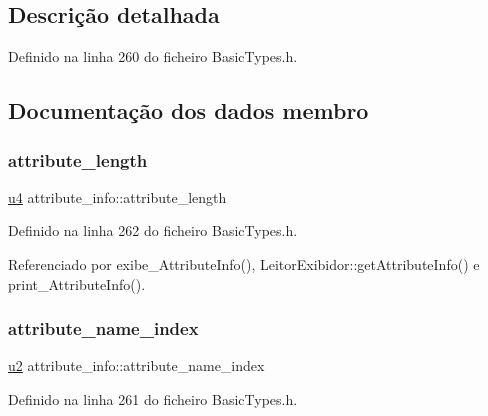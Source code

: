 \subsection{Descrição detalhada}


Definido na linha 260 do ficheiro Basic\+Types.\+h.



\subsection{Documentação dos dados membro}
\mbox{\label{structattribute__info_a1ed8f679458c4bb0ed3315721588f50d}} 
\subsubsection{\texorpdfstring{attribute\+\_\+length}{attribute\_length}}
{\footnotesize\ttfamily \hyperlink{BasicTypes_8h_ae5be1f726785414dd1b77d60df074c9d}{u4} attribute\+\_\+info\+::attribute\+\_\+length}



Definido na linha 262 do ficheiro Basic\+Types.\+h.



Referenciado por exibe\+\_\+\+Attribute\+Info(), Leitor\+Exibidor\+::get\+Attribute\+Info() e print\+\_\+\+Attribute\+Info().

\mbox{\label{structattribute__info_a19df9d4b42eb55ca5dc1bed98df89378}} 
\subsubsection{\texorpdfstring{attribute\+\_\+name\+\_\+index}{attribute\_name\_index}}
{\footnotesize\ttfamily \hyperlink{BasicTypes_8h_a732cde1300aafb73b0ea6c2558a7a54f}{u2} attribute\+\_\+info\+::attribute\+\_\+name\+\_\+index}



Definido na linha 261 do ficheiro Basic\+Types.\+h.



